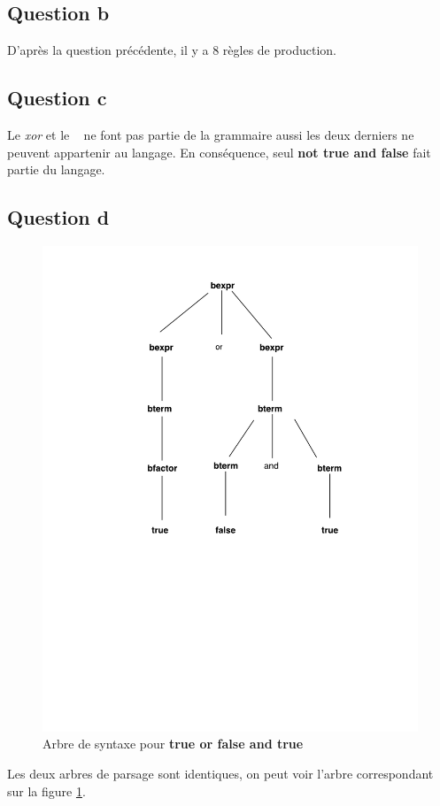 \documentclass{article}
\begin{document}
 \subsection*{Question b}
 	D'après la question précédente, il y a 8 règles de production.
 	
 \subsection*{Question c}
 	Le \textit{xor} et le ~ ne font pas partie de la grammaire aussi les deux derniers ne peuvent appartenir au langage. En conséquence, seul \textbf{not true and false} fait partie du langage.
 	
 	\subsection*{Question d}
 \begin{figure}[h]
 	\centering
 	\includegraphics[width=0.7\linewidth]{Images/AST}
 	\caption[AST]{Arbre de syntaxe pour \textbf{true or false and true}}
 	\label{fig:ast}
 \end{figure}
 Les deux arbres de parsage sont identiques, on peut voir l'arbre correspondant sur la figure \ref{fig:ast}.
 
\end{document}
